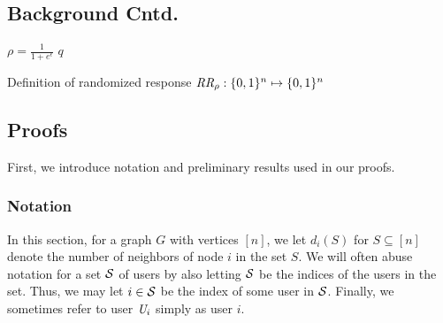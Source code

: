 \graphicspath{{./chapters/chapter4/}}
\chapter{ }

\section{Background Cntd.}\label{chap4-app:background}


\setlength{\textfloatsep}{2pt}
%  
\begin{algorithm}
  $\rho=\frac{1}{1+e^{\epsilon}}$\;
  \KwRet $q$
  \caption[Definition of randomized respone $\rr_\rho$.]{Definition of randomized response $\textit{RR}_\rho: \{0,1\}^n\mapsto\{0,1\}^n$ }\label{chap4-alg:rr}
\end{algorithm}

\section{Proofs}\label{chap4-app:proofs}
First, we introduce notation and preliminary results used in our proofs.
\subsection{Notation} In this section, for a graph $G$ with vertices $[n]$, we let $d_i(S)$ for $S \subseteq [n]$ denote the number of neighbors of node $i$ in the set $S$.
We will often abuse notation for a set $\mathcal{S}$ of users by also letting $\mathcal{S}$ be the indices of the users in the set. Thus, we may let $i \in \mathcal{S}$ be the index of some user in $\mathcal{S}$.
Finally, we sometimes refer to user $\textit{U}_i$ simply as user $i$.

